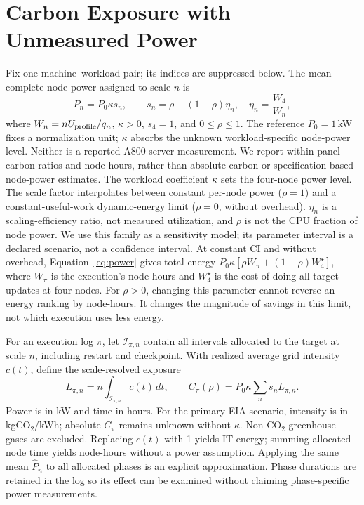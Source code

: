 \section{Carbon Exposure with Unmeasured Power}
\label{sec:accounting}

Fix one machine--workload pair; its indices are suppressed below. The mean
complete-node power assigned to scale $n$ is
\begin{equation}
 \widehat P_n=P_0\kappa s_n,\qquad
 s_n=\rho+(1-\rho)\eta_n,\quad
 \eta_n=\frac{W_4}{W_n},
 \label{eq:power}
\end{equation}
where $W_n=nU_{\rm profile}/q_n$, $\kappa>0$, $s_4=1$, and
$0\leq\rho\leq1$. The reference $P_0=1$\,kW fixes a normalization unit; $\kappa$ absorbs the
unknown workload-specific node-power level. Neither is a reported A800 server
measurement. We report within-panel carbon ratios and node-hours, rather than
absolute carbon or specification-based node-power estimates.
The workload coefficient $\kappa$ sets the four-node power level. The scale
factor interpolates between constant per-node power ($\rho=1$) and a
constant-useful-work dynamic-energy limit ($\rho=0$, without overhead).
$\eta_n$ is a scaling-efficiency ratio, not measured utilization, and $\rho$
is not the CPU fraction of node power. We use this family as a sensitivity
model; its parameter interval is a declared scenario, not a confidence interval.
At constant CI and without overhead, Equation~\ref{eq:power} gives total energy
$P_0\kappa[\rho W_\pi+(1-\rho)W_4^\star]$, where $W_\pi$ is the
execution's node-hours and $W_4^\star$ is the cost of doing all target updates
at four nodes. For $\rho>0$, changing this parameter cannot reverse an energy
ranking by node-hours. It changes the magnitude of savings in this limit,
not which execution uses less energy.

For an execution log $\pi$, let $\mathcal I_{\pi,n}$ contain all intervals
allocated to the target at scale $n$, including restart and checkpoint. With
realized average grid intensity $c(t)$, define the scale-resolved exposure
\begin{equation}
 L_{\pi,n}=n\int_{\mathcal I_{\pi,n}}c(t)\,dt,
 \qquad
 C_\pi(\rho)=P_0\kappa\sum_n s_n L_{\pi,n}.
 \label{eq:exposure}
\end{equation}
Power is in kW and time in hours. For the primary EIA scenario, intensity is
in kgCO$_2$/kWh; absolute $C_\pi$ remains unknown without $\kappa$.
Non-CO$_2$ greenhouse gases are
excluded. Replacing $c(t)$ with 1 yields IT energy; summing
allocated node time yields node-hours without a power assumption. Applying
the same mean $\widehat P_n$ to all allocated phases is an explicit
approximation. Phase durations are retained in the log so its effect can be
examined without claiming phase-specific power measurements.

